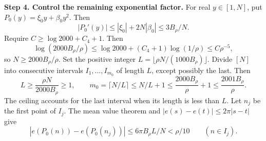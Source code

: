 \documentclass[twoside]{aomart}
\makeatletter
\theoremstyle{paperplain}
\theoremstyle{paperdefinition}
\renewenvironment{proof}[1][\proofname]{\par\pushQED{\qed}%
  \normalfont\topsep6\p@\@plus3\p@\relax\trivlist
  \item[\hskip\labelsep\itshape #1\@addpunct{.}]\ignorespaces
}{\popQED\endtrivlist\@endpefalse}
\numberwithin{equation}{section}
\makeatother
\begin{document}
\begin{proof}
\par
\medskip
\noindent\textbf{Step 4. Control the remaining exponential factor.}
For real $y\in[1,N]$, put $P_0(y)=\xi_0y+\beta_0y^2$. Then
\begin{equation*}
 |P_0'(y)|\le|\xi_0|+2N|\beta_0|\le3B_\rho/N.
\end{equation*}
Require $C\ge\log2000+C_4+1$. Then
\[
 \log(2000B_\rho/\rho)
 \le\log2000+(C_4+1)\log(1/\rho)\le C\rho^{-5},
\]
so $N\ge2000B_\rho/\rho$. Set the positive integer
$L=\lfloor\rho N/(1000B_\rho)\rfloor$.
Divide $[N]$ into consecutive intervals $I_1,\ldots,I_{m_0}$
of length $L$, except possibly the last. Then
\begin{equation*}
 L\ge\frac{\rho N}{2000B_\rho}\ge1,\qquad m_0=\lceil N/L\rceil\le N/L+1\le\frac{2000B_\rho}{\rho}+1\le\frac{2001B_\rho}{\rho}.
\end{equation*}
The ceiling accounts for the last interval when its length is less than $L$.
Let $n_j$ be the first point of $I_j$. The mean value theorem and
$|e(s)-e(t)|\le2\pi|s-t|$ give
\begin{equation}
 |e(P_0(n))-e(P_0(n_j))|
 \le6\pi B_\rho L/N<\rho/10
 \qquad(n\in I_j).
 \label{sc:scalar-phase-freezing-error}
\end{equation}


\end{proof}
\end{document}
